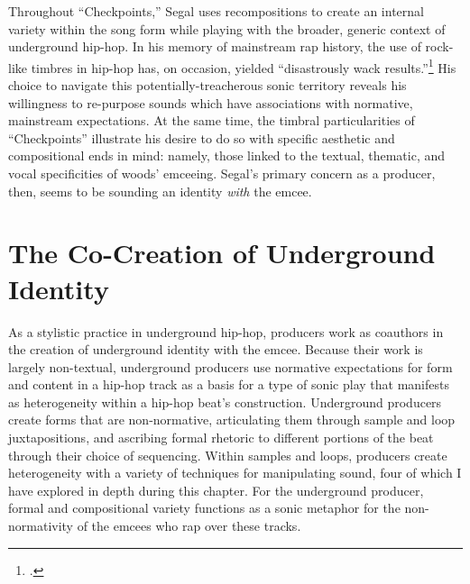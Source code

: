 Throughout ``Checkpoints,'' Segal uses  recompositions to create an internal variety within the song
form while playing with the broader, generic context of underground hip-hop. In his memory of 
mainstream rap history, the use of rock-like timbres in hip-hop has,  on occasion, yielded ``disastrously
wack results.''\footnote{
    \cite{backwoodzhiphopKennySegalPresents2019}.}
His choice to navigate this potentially-treacherous sonic territory reveals his willingness to re-purpose
sounds which have associations with normative, mainstream expectations. At the same time, the timbral
particularities of ``Checkpoints'' illustrate his desire to do so with specific aesthetic
and compositional ends in mind: namely, those linked to the textual, thematic, and vocal specificities
of woods' emceeing. Segal's primary concern as a  producer, then, seems to be sounding an identity
\emph{with} the emcee.

\section{The Co-Creation of Underground Identity}
As a stylistic practice in underground hip-hop, producers work as coauthors in the creation of underground
identity with the emcee. Because their work is largely non-textual, underground producers use normative 
expectations for form and content in a hip-hop track as a basis for a type of sonic play that manifests
as heterogeneity within a hip-hop beat's construction. Underground producers create forms that are 
non-normative, articulating them through sample and loop juxtapositions, and ascribing formal rhetoric 
to different portions of the beat through their choice of sequencing. Within samples and loops, producers
create heterogeneity with a variety of techniques for manipulating  sound, four of which I have explored
in depth during this chapter. For the underground producer, formal and compositional variety functions
as a sonic metaphor for the non-normativity of the emcees who rap over these tracks.